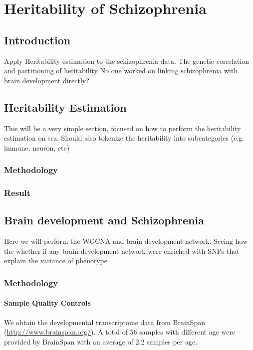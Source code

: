 \chapter{Heritability of Schizophrenia}

\section{Introduction}
Apply Heritability estimation to the schizophrenia data.
The genetic correlation and partitioning of heritability
No one worked on linking schizophrenia with brain development directly?
\section{Heritability Estimation}
This will be a very simple section, focused on how to perform the heritability estimation on \acrfull{scz}.
Should also tokenize the heritability into subcategories (e.g. immune, neuron, etc)


\subsection{Methodology}
\subsection{Result}
\section{Brain development and Schizophrenia}
Here we will perform the WGCNA and brain development network.
Seeing how the whether if any brain development network were enriched with SNPs that explain the variance of phenotype
\subsection{Methodology}
\subsubsection{Sample Quality Controls}
We obtain the developmental transcriptome data from BrainSpan (\url{http://www.brainspan.org/}). 
A total of 56 samples with different age were provided by BrainSpan with an average of 2.2 samples per age.

